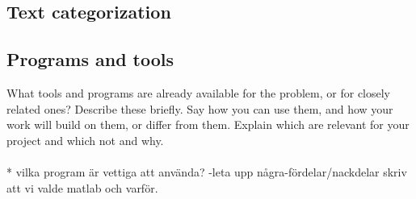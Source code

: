 \subsection{Text categorization}


\subsection{Programs and tools}
What tools and programs are already available for the problem, or for closely related ones?
Describe these briefly. Say how you can use them, and how your work will build on them, or differ from them. Explain which are relevant for your project and which not and why.
\\\\
* vilka program är vettiga att använda? -leta upp några-fördelar/nackdelar
skriv att vi valde matlab och varför.




